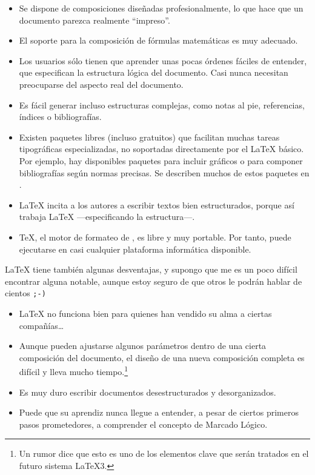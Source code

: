 \begin{itemize}
  \item Se dispone de composiciones diseñadas profesionalmente, lo que  hace que un documento parezca realmente ``impreso''.
  \item El soporte para la composición de fórmulas matemáticas es muy  adecuado.
  \item Los usuarios sólo tienen que aprender unas pocas órdenes fáciles  de entender, que especifican la estructura lógica del documento.  Casi nunca necesitan preocuparse del aspecto real del documento.
  \item Es fácil generar incluso estructuras complejas, como notas al  pie, referencias, índices o bibliografías.
  \item Existen paquetes libres (incluso gratuitos) que facilitan muchas tareas tipográficas especializadas, no soportadas directamente por el \LaTeX{} básico.  Por ejemplo, hay disponibles paquetes para incluir gráficos o para componer bibliografías según normas precisas.  Se describen muchos de estos paquetes en \companion.
  \item \LaTeX{} incita a los autores a escribir textos bien estructurados, porque así trabaja \LaTeX{} ---especificando la estructura---.
  \item \TeX, el motor de formateo de \LaTeXe, es libre y muy portable. Por tanto, puede ejecutarse en casi cualquier plataforma informática disponible.
%
%
\end{itemize}


\LaTeX{} tiene también algunas desventajas, y supongo que me es un poco difícil encontrar alguna notable, aunque estoy seguro de que otros le podrán hablar de cientos \texttt{;-)}


\begin{itemize}
  \item \LaTeX{} no funciona bien para quienes han vendido su alma a ciertas compañías\ldots
  \item Aunque pueden ajustarse algunos parámetros dentro de una cierta composición del documento, el diseño de una nueva composición completa es difícil y lleva mucho tiempo.\footnote{Un rumor dice que esto es uno de los elementos clave que serán tratados en el futuro sistema \LaTeX 3.} 
  \item Es muy duro escribir documentos desestructurados y desorganizados.
  \item Puede que su aprendiz nunca llegue a entender, a pesar de ciertos primeros  pasos prometedores, a comprender el concepto de Marcado Lógico.
\end{itemize}
 
